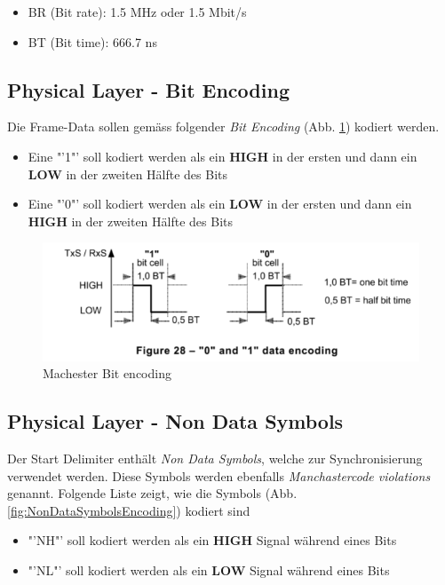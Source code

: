 \begin{itemize}
  \item BR (Bit rate): 1.5 MHz oder 1.5 Mbit/s
  \item BT (Bit time): 666.7 ns
\end{itemize}

\subsection{Physical Layer - Bit Encoding}
\label{sub:BitEncoding}
Die Frame-Data sollen gemäss folgender \textit{Bit Encoding} (Abb. \ref{fig:manchester_Bit_Encoding}) kodiert werden.

\begin{itemize}
    \item Eine "'1"' soll kodiert werden als ein \textbf{HIGH} in der ersten und dann ein \textbf{LOW} in der zweiten Hälfte des Bits
    \item Eine "'0"' soll kodiert werden als ein \textbf{LOW} in der ersten und dann ein \textbf{HIGH} in der zweiten Hälfte des Bits
\end{itemize}

\begin{figure}[H]
    \centering
    \includegraphics[width = 0.7 \textwidth]{Figures/Chap2/Grundlagen/MVB_DOKU/Layer/Bit_Encoding.png}
    \caption{Machester Bit encoding}
    \label{fig:manchester_Bit_Encoding}
\end{figure}

\subsection{Physical Layer - Non Data Symbols} 
\label{sub:NonDataSymbols}
Der Start Delimiter enthält \textit{Non Data Symbols}, welche zur Synchronisierung verwendet werden. Diese Symbols werden ebenfalls \textit{Manchastercode violations} genannt. Folgende Liste zeigt, wie die Symbols (Abb. \ref{fig:NonDataSymbolsEncoding}) kodiert sind

\begin{itemize}
    \item "'NH"' soll kodiert werden als ein \textbf{HIGH} Signal während eines Bits 
    \item "'NL"' soll kodiert werden als ein \textbf{LOW} Signal während eines Bits
\end{itemize}

